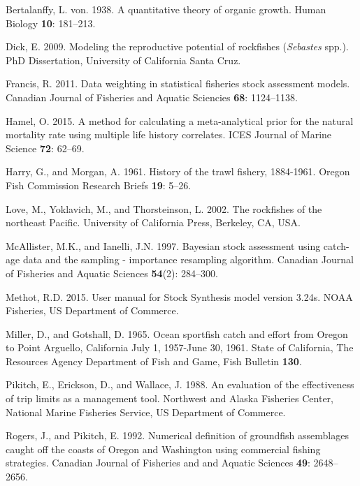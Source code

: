 \documentclass[12pt,]{article}
\begin{document}
\hypertarget{ref-vonB1938}{}
Bertalanffy, L. von. 1938. A quantitative theory of organic growth.
Human Biology \textbf{10}: 181--213.

\hypertarget{ref-Dick2009}{}
Dick, E. 2009. Modeling the reproductive potential of rockfishes
(\emph{Sebastes} spp.). PhD Dissertation, University of California Santa
Cruz.

\hypertarget{ref-Francis2011}{}
Francis, R. 2011. Data weighting in statistical fisheries stock
assessment models. Canadian Journal of Fisheries and Aquatic Sciencies
\textbf{68}: 1124--1138.

\hypertarget{ref-Hamel2015}{}
Hamel, O. 2015. A method for calculating a meta-analytical prior for the
natural mortality rate using multiple life history correlates. ICES
Journal of Marine Science \textbf{72}: 62--69.

\hypertarget{ref-Harry1961}{}
Harry, G., and Morgan, A. 1961. History of the trawl fishery, 1884-1961.
Oregon Fish Commission Research Briefs \textbf{19}: 5--26.

\hypertarget{ref-Love2002}{}
Love, M., Yoklavich, M., and Thorsteinson, L. 2002. The rockfishes of
the northeast Pacific. University of California Press, Berkeley, CA,
USA.

\hypertarget{ref-McAllister1997}{}
McAllister, M.K., and Ianelli, J.N. 1997. Bayesian stock assessment
using catch-age data and the sampling - importance resampling algorithm.
Canadian Journal of Fisheries and Aquatic Sciences \textbf{54}(2):
284--300.

\hypertarget{ref-Methot2015}{}
Methot, R.D. 2015. User manual for Stock Synthesis model version 3.24s.
NOAA Fisheries, US Department of Commerce.

\hypertarget{ref-Miller1965}{}
Miller, D., and Gotshall, D. 1965. Ocean sportfish catch and effort from
Oregon to Point Arguello, California July 1, 1957-June 30, 1961. State
of California, The Resources Agency Department of Fish and Game, Fish
Bulletin \textbf{130}.

\hypertarget{ref-Pikitch1988}{}
Pikitch, E., Erickson, D., and Wallace, J. 1988. An evaluation of the
effectiveness of trip limits as a management tool. Northwest and Alaska
Fisheries Center, National Marine Fisheries Service, US Department of
Commerce.

\hypertarget{ref-Rogers1992}{}
Rogers, J., and Pikitch, E. 1992. Numerical definition of groundfish
assemblages caught off the coasts of Oregon and Washington using
commercial fishing strategies. Canadian Journal of Fisheries and and
Aquatic Sciences \textbf{49}: 2648--2656.
\end{document}

